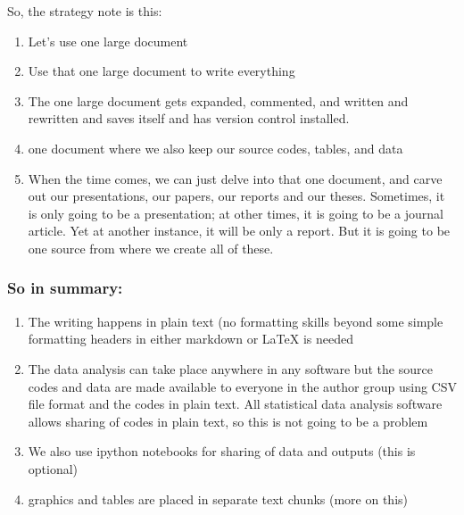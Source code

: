 So, the strategy note is this:

\begin{enumerate}
\item Let's use one large document
\item Use that one large document to write everything
\item The one large document gets expanded, commented, and written and rewritten and saves itself and has version control installed.
\item one document where we also keep our source codes, tables, and data
\item When the time comes, we can just delve into that one document, and carve out our presentations, our papers, our reports and our theses. Sometimes, it is only going to be a presentation; at other times, it is going to be a journal article. Yet at another instance, it will be only a report. But it is going to be one source from where we create all of these. 
\end{enumerate}

\subsubsection{So in summary:}

\begin{enumerate}
\item The writing happens in plain text (no formatting skills beyond some simple formatting headers in either markdown or LaTeX is needed
\item The data analysis can take place anywhere in any software but the source codes and data are made available to everyone in the author group using CSV file format and the codes in plain text. All statistical data analysis software allows sharing of codes in plain text, so this is not going to be a problem
\item We also use ipython notebooks for sharing of data and outputs (this is optional)
\item graphics and tables are placed in separate text chunks (more on this)
\end{enumerate}


    
    
    
    
    